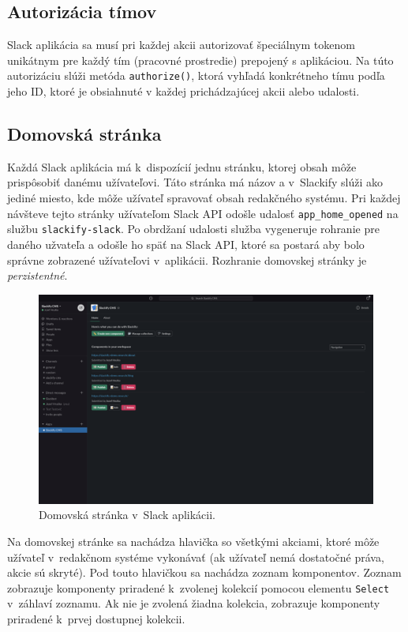 \subsection{Autorizácia tímov}
Slack aplikácia sa musí pri každej akcii autorizovať špeciálnym tokenom  unikátnym pre každý tím (pracovné prostredie) prepojený s aplikáciou. Na túto autorizáciu slúži metóda \texttt{authorize()}, ktorá vyhľadá  konkrétneho tímu podľa jeho ID, ktoré je obsiahnuté v každej prichádzajúcej akcii alebo udalosti.

\subsection{Domovská stránka}
Každá Slack aplikácia má k~dispozícií jednu stránku, ktorej obsah môže prispôsobiť danému užívateľovi. Táto stránka má názov  a v~Slackify slúži ako jediné miesto, kde môže užívateľ spravovať obsah redakčného systému. Pri každej návšteve tejto stránky užívateľom Slack API odošle udalosť \texttt{app\_home\_opened} na službu \texttt{slackify-slack}. Po obrdžaní udalosti služba vygeneruje rohranie pre daného užvateľa a odošle ho späť na Slack API, ktoré sa postará aby bolo správne zobrazené užívateľovi v~aplikácii. Rozhranie domovskej stránky je \emph{perzistentné}.

\begin{figure}[h]
	\centering
	\includegraphics[scale=0.085]{obrazky-figures/screenshot_slack-home}
	\caption{Domovská stránka v~Slack aplikácii.}
\end{figure}

\noindent Na domovskej stránke sa nachádza hlavička so všetkými akciami, ktoré môže užívateľ v~redakčnom systéme vykonávať (ak užívateľ nemá dostatočné práva, akcie sú skryté). Pod touto hlavičkou sa nachádza zoznam komponentov. Zoznam zobrazuje komponenty priradené k~zvolenej kolekcií pomocou elementu \texttt{Select} v~záhlaví zoznamu. Ak nie je zvolená žiadna kolekcia, zobrazuje komponenty priradené k~prvej dostupnej kolekcii. \\

